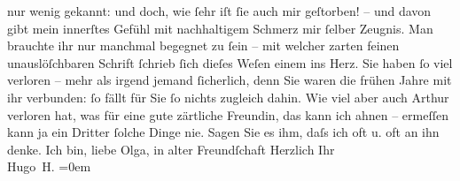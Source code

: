 \begin{ledgroupsized}[t]{13cm}
               nur wenig gekannt: und doch, wie ſehr iſt ſie auch mir geſtorben! – und davon gibt
               mein innerſtes Gefühl mit nachhaltigem Schmerz mir ſelber Zeugnis. Man brauchte ihr
               nur manchmal begegnet zu ſein – mit welcher zarten feinen unauslöſchbaren Schrift
               ſchrieb ſich dieſes Weſen
               einem ins Herz. Sie haben ſo viel {\pb}verloren – mehr als
               irgend jemand ſicherlich, denn Sie waren die frühen Jahre mit ihr verbunden: ſo fällt
               für Sie ſo nichts zugleich dahin.\pend
           \pstart
           Wie viel aber auch Arthur verloren hat, was für
               eine gute zärtliche Freundin, das kann ich ahnen – ermeſſen kann ja ein Dritter
               ſolche Dinge nie. Sagen Sie es ihm, daſs ich oft u. oft an ihn denke.\pend
           \pstart
           {\pb}Ich bin, liebe Olga, in alter Freundſchaft\pend
           \pstart
           Herzlich Ihr{\\[\baselineskip]}\spacefill\mbox{Hugo H.}\pend
           \leftskip=0em{}
         
         \endnumbering{}\end{ledgroupsized}  \newcommand{\dateiname}{L02340}\newcommand{\titel}{Hugo von Hofmannsthal an Olga Schnitzler, 17. 4. 1920}\newcommand{\editorInnen}{ Martin Anton Müller und Gerd-Hermann Susen}
      